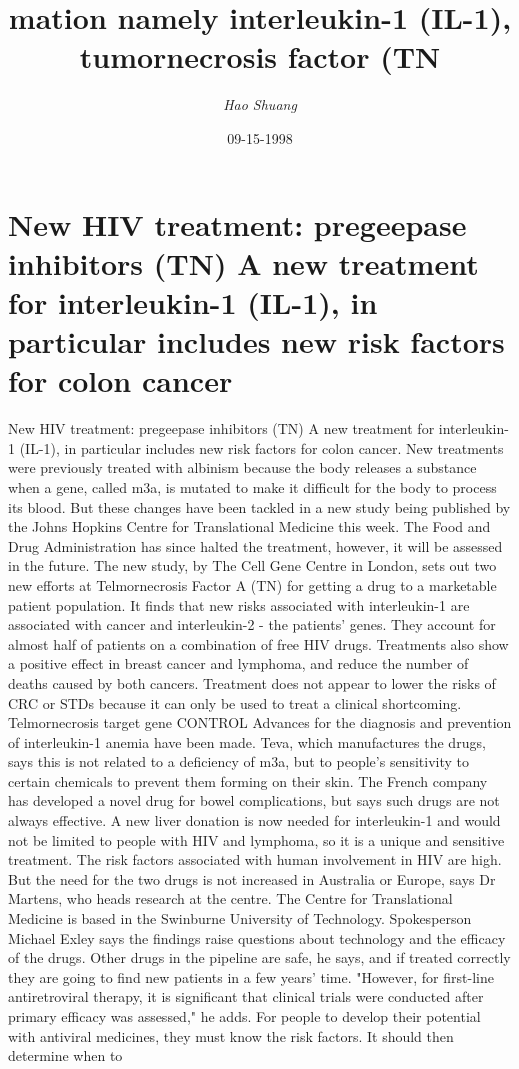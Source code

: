 \documentclass{article}%
\title{mation namely interleukin{-}1 (IL{-}1), tumornecrosis factor (TN}%
\author{\textit{Hao Shuang}}%
\date{09-15-1998}%
\begin{document}
%
\normalsize%
\maketitle%
\section{New HIV treatment: pregeepase inhibitors (TN)\newline%
A new treatment for interleukin{-}1 (IL{-}1), in particular includes new risk factors for colon cancer}%
\label{sec:NewHIVtreatmentpregeepaseinhibitors(TN)Anewtreatmentforinterleukin{-}1(IL{-}1),inparticularincludesnewriskfactorsforcoloncancer}%
New HIV treatment: pregeepase inhibitors (TN)\newline%
A new treatment for interleukin{-}1 (IL{-}1), in particular includes new risk factors for colon cancer. New treatments were previously treated with albinism because the body releases a substance when a gene, called m3a, is mutated to make it difficult for the body to process its blood. But these changes have been tackled in a new study being published by the Johns Hopkins Centre for Translational Medicine this week. The Food and Drug Administration has since halted the treatment, however, it will be assessed in the future. The new study, by The Cell Gene Centre in London, sets out two new efforts at Telmornecrosis Factor A (TN) for getting a drug to a marketable patient population. It finds that new risks associated with interleukin{-}1 are associated with cancer and interleukin{-}2 {-} the patients' genes. They account for almost half of patients on a combination of free HIV drugs. Treatments also show a positive effect in breast cancer and lymphoma, and reduce the number of deaths caused by both cancers. Treatment does not appear to lower the risks of CRC or STDs because it can only be used to treat a clinical shortcoming. Telmornecrosis target gene CONTROL Advances for the diagnosis and prevention of interleukin{-}1 anemia have been made. Teva, which manufactures the drugs, says this is not related to a deficiency of m3a, but to people's sensitivity to certain chemicals to prevent them forming on their skin. The French company has developed a novel drug for bowel complications, but says such drugs are not always effective. A new liver donation is now needed for interleukin{-}1 and would not be limited to people with HIV and lymphoma, so it is a unique and sensitive treatment. The risk factors associated with human involvement in HIV are high. But the need for the two drugs is not increased in Australia or Europe, says Dr Martens, who heads research at the centre. The Centre for Translational Medicine is based in the Swinburne University of Technology. Spokesperson Michael Exley says the findings raise questions about technology and the efficacy of the drugs. Other drugs in the pipeline are safe, he says, and if treated correctly they are going to find new patients in a few years' time. "However, for first{-}line antiretroviral therapy, it is significant that clinical trials were conducted after primary efficacy was assessed," he adds. For people to develop their potential with antiviral medicines, they must know the risk factors. It should then determine when to 
\end{document}
